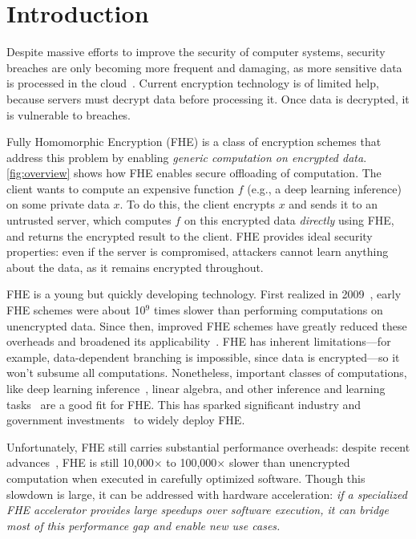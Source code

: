 \chapter{Introduction}\label{sec:intro}

Despite massive efforts to improve the security of computer systems, security
breaches are only becoming more frequent and damaging, as more sensitive data
is processed in the
cloud~\cite{malekos-smith:csis20:hidden-costs-cybercrime,ibm20:breach-cost-report}.
Current encryption technology is of limited help, because servers must decrypt
data before processing it. Once data is decrypted, it is vulnerable to
breaches.

Fully Homomorphic Encryption (FHE) is a class of encryption schemes that
address this problem by enabling \emph{generic computation on encrypted data}.
\autoref{fig:overview} shows how FHE enables secure offloading of computation.
The client wants to compute an expensive function $f$ (e.g., a deep learning
inference) on some private data $x$. To do this, the client encrypts $x$ and
sends it to an untrusted server, which computes $f$ on this encrypted data
\emph{directly} using FHE, and returns the encrypted result to the client. FHE
provides ideal security properties: even if the server is compromised,
attackers cannot learn anything about the data, as it remains encrypted
throughout.

\figOverview

FHE is a young but quickly developing technology. First realized in
2009~\cite{gentry09}, early FHE schemes were about 10$^9$ times slower than
performing computations on unencrypted data. Since then, improved FHE schemes
have greatly reduced these overheads and broadened its
applicability~\cite{albrecht:hesg18:standard,peikert2016decade}. FHE has
inherent limitations---for example, data-dependent branching is impossible,
since data is encrypted---so it won't subsume all computations. Nonetheless,
important classes of computations, like deep learning
inference~\cite{cheon:ictaci17:homomorphic,dathathri:pldi19:chet,dathathri:pldi20:eva},
linear algebra, and other inference and learning
tasks~\cite{han:aaai19:logistic} are a good fit for FHE. This has sparked
significant industry and government investments~\cite{ibm,intel,dprive} to
widely deploy FHE.

Unfortunately, FHE still carries substantial performance overheads: despite
recent advances~\cite{dathathri:pldi19:chet, dathathri:pldi20:eva,
roy:hpca19:fpga-he, brutzkus:icml19:low, polyakov:17:palisade}, FHE is still
10,000$\times$ to 100,000$\times$ slower than unencrypted computation when
executed in carefully optimized software. Though this slowdown is large, it can
be addressed with hardware acceleration: \emph{if a specialized FHE accelerator
provides large speedups over software execution, it can bridge most of this
performance gap and enable new use cases.}

